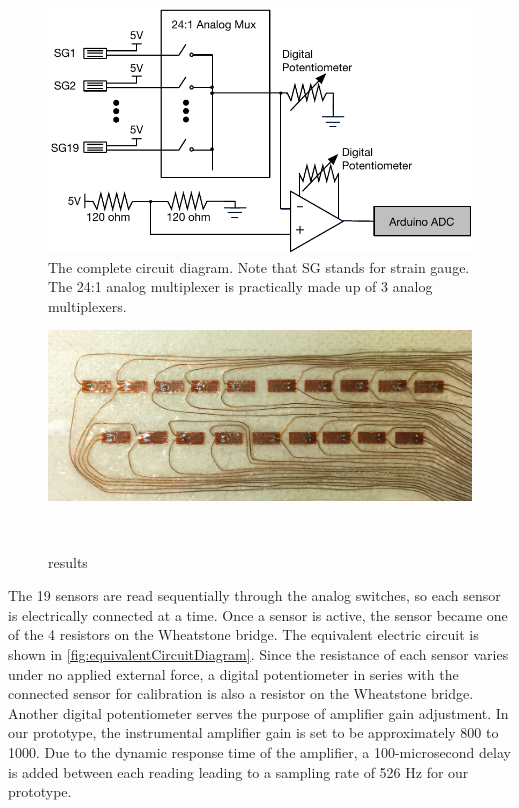 \documentclass{sigchi}
\begin{document}
\begin{figure}
  \includegraphics[width=1\columnwidth]{figures/CompleteDiagram_v2.pdf}
  \caption{The complete circuit diagram. Note that SG stands for strain gauge. The 24:1 analog multiplexer is practically made up of 3 analog multiplexers.}
  \label{fig:completeCircuitDiagram}
\end{figure}

\begin{figure}
 \begin{center}
  \includegraphics[width=1\columnwidth]{figures/tie.png}
  \caption{
    results
  }~\label{fig:tie}
  \end{center}
\end{figure}

The 19 sensors are read sequentially through the analog switches, so each sensor is electrically connected at a time. Once a sensor is active, the sensor became one of the 4 resistors on the Wheatstone bridge. The equivalent electric circuit is shown in \autoref{fig:equivalentCircuitDiagram}. Since the resistance of each sensor varies under no applied external force, a digital potentiometer in series with the connected sensor for calibration is also a resistor on the Wheatstone bridge. Another digital potentiometer serves the purpose of amplifier gain adjustment. In our prototype, the instrumental amplifier gain is set to be approximately 800 to 1000. Due to the dynamic response time of the amplifier, a 100-microsecond delay is added between each reading leading to a sampling rate of 526 Hz for our prototype.
\end{document}
